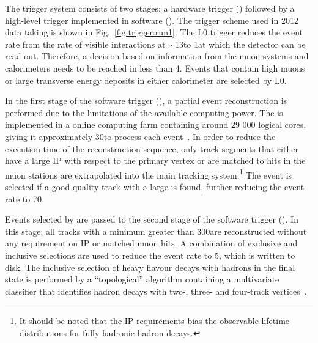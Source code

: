 The trigger system consists of two stages: a hardware trigger (\lone) followed by a high-level trigger implemented in software (\hlt). The trigger scheme used in 2012 data taking is shown in Fig.~\ref{fig:trigger:run1}. The L0 trigger reduces the event rate from the rate of visible interactions at $\sim$13\mhz to 1\mhz at which the \lhcb detector can be read out. Therefore, a decision based on information from the muon systems and calorimeters needs to be reached in less than 4\mus. Events that contain high \pt muons or large transverse energy deposits in either calorimeter are selected by L0.

In the first stage of the software trigger (\hltone), a partial event reconstruction is performed due to the limitations of the available computing power. The \hlt is implemented in a online computing farm containing around 29 000 logical cores, giving it approximately 30\ms to process each event~\cite{trigger-cpu}. In order to reduce the execution time of the reconstruction sequence, only \velo track segments that either have a large IP with respect to the primary vertex or are matched to hits in the muon stations are extrapolated into the main tracking system.{\footnote{It should be noted that the IP requirements bias the observable lifetime distributions for fully hadronic \bquark hadron decays.}} The event is selected if a good quality track with a large \pt is found, further reducing the event rate to 70\khz. 

Events selected by \hltone are passed to the second stage of the software trigger (\hlttwo). In this stage, all tracks with a minimum \pt greater than 300\mevc are reconstructed without any requirement on IP or matched muon hits. A combination of exclusive and inclusive selections are used to reduce the event rate to 5\khz, which is written to disk. The inclusive selection of heavy flavour decays with hadrons in the final state is performed by a ``topological'' algorithm containing a multivariate classifier that identifies \bquark hadron decays with two-, three- and four-track vertices~\cite{trigger-inclusive,trigger-topo}.

